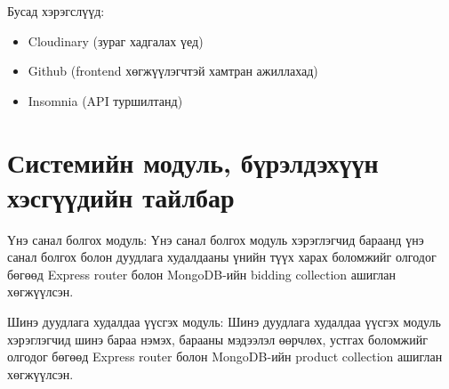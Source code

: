  Бусад хэрэгслүүд:
 \begin{itemize}
    \item Cloudinary (зураг хадгалах үед)
    \item Github (frontend хөгжүүлэгчтэй хамтран ажиллахад)
    \item Insomnia (API туршилтанд)
\end{itemize}

\section{Системийн модуль, бүрэлдэхүүн хэсгүүдийн тайлбар}
Үнэ санал болгох модуль:
 Үнэ санал болгох модуль хэрэглэгчид бараанд үнэ санал болгох болон  дуудлага худалдааны үнийн түүх харах боломжийг олгодог бөгөөд Express router болон MongoDB-ийн bidding collection ашиглан хөгжүүлсэн.

Шинэ дуудлага худалдаа үүсгэх модуль:
 Шинэ дуудлага худалдаа үүсгэх модуль хэрэглэгчид шинэ бараа нэмэх, барааны мэдээлэл өөрчлөх, устгах боломжийг олгодог бөгөөд Express router болон MongoDB-ийн product collection ашиглан хөгжүүлсэн.

